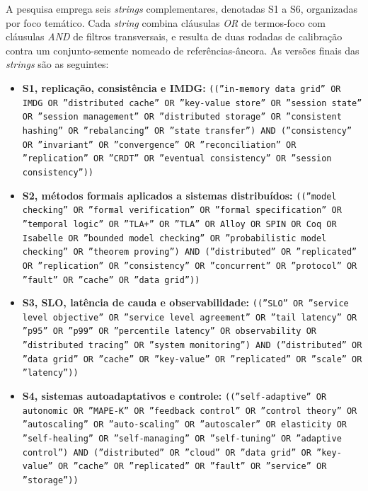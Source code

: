 A pesquisa emprega seis \emph{strings} complementares, denotadas S1 a S6, organizadas por foco temático. Cada \emph{string} combina cláusulas \emph{OR} de termos-foco com cláusulas \emph{AND} de filtros transversais, e resulta de duas rodadas de calibração contra um conjunto-semente nomeado de referências-âncora. As versões finais das \emph{strings} são as seguintes:

\begin{itemize}[leftmargin=*]
    \item \textbf{S1, replicação, consistência e IMDG:} \texttt{((''in-memory data grid'' OR IMDG OR ''distributed cache'' OR ''key-value store'' OR ''session state'' OR ''session management'' OR ''distributed storage'' OR ''consistent hashing'' OR ''rebalancing'' OR ''state transfer'') AND (''consistency'' OR ''invariant'' OR ''convergence'' OR ''reconciliation'' OR ''replication'' OR ''CRDT'' OR ''eventual consistency'' OR ''session consistency''))}

    \item \textbf{S2, métodos formais aplicados a sistemas distribuídos:} \texttt{((''model checking'' OR ''formal verification'' OR ''formal specification'' OR ''temporal logic'' OR ''TLA+'' OR ''TLA'' OR Alloy OR SPIN OR Coq OR Isabelle OR ''bounded model checking'' OR ''probabilistic model checking'' OR ''theorem proving'') AND (''distributed'' OR ''replicated'' OR ''replication'' OR ''consistency'' OR ''concurrent'' OR ''protocol'' OR ''fault'' OR ''cache'' OR ''data grid''))}

    \item \textbf{S3, SLO, latência de cauda e observabilidade:} \texttt{((''SLO'' OR ''service level objective'' OR ''service level agreement'' OR ''tail latency'' OR ''p95'' OR ''p99'' OR ''percentile latency'' OR observability OR ''distributed tracing'' OR ''system monitoring'') AND (''distributed'' OR ''data grid'' OR ''cache'' OR ''key-value'' OR ''replicated'' OR ''scale'' OR ''latency''))}

    \item \textbf{S4, sistemas autoadaptativos e controle:} \texttt{((''self-adaptive'' OR autonomic OR ''MAPE-K'' OR ''feedback control'' OR ''control theory'' OR ''autoscaling'' OR ''auto-scaling'' OR ''autoscaler'' OR elasticity OR ''self-healing'' OR ''self-managing'' OR ''self-tuning'' OR ''adaptive control'') AND (''distributed'' OR ''cloud'' OR ''data grid'' OR ''key-value'' OR ''cache'' OR ''replicated'' OR ''fault'' OR ''service'' OR ''storage''))}


\end{itemize}
